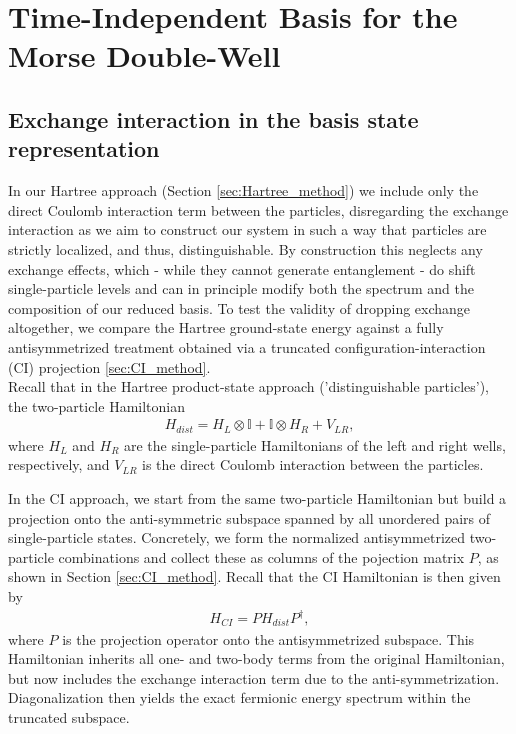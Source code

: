 \documentclass{subfiles}
\begin{document}
\section{Time-Independent Basis for the Morse Double-Well}\label{sec:time_independent_basis}


\subsection{Exchange interaction in the basis state representation}
In our Hartree approach (Section \ref{sec:Hartree_method}) we include only the direct Coulomb interaction term between the particles, disregarding the exchange interaction as we aim to construct our system in such a way that particles are strictly localized, and thus, distinguishable. By construction this neglects any exchange effects, which - while they cannot generate entanglement - do shift single-particle levels and can in principle modify both the spectrum and the composition of our reduced basis. To test the validity of dropping exchange altogether, we compare the Hartree ground-state energy against a fully antisymmetrized treatment obtained via a truncated configuration-interaction (CI) projection \ref{sec:CI_method}. \\ 

Recall that in the Hartree product-state approach ('distinguishable particles'), the two-particle Hamiltonian
\begin{align*}
    H_{dist} = H_L \otimes \mathbb{I} + \mathbb{I} \otimes H_R + V_{LR},
\end{align*}
where $H_L$ and $H_R$ are the single-particle Hamiltonians of the left and right wells, respectively, and $V_{LR}$ is the direct Coulomb interaction between the particles. 

In the CI approach, we start from the same two-particle Hamiltonian but build a projection onto the anti-symmetric subspace spanned by all unordered pairs of single-particle states. Concretely, we form the normalized antisymmetrized two-particle combinations and  collect these as columns of the pojection matrix $P$, as shown in Section \ref{sec:CI_method}. Recall that the CI Hamiltonian is then given by
\begin{align*}
    H_{CI} = P H_{dist} P^\dagger,
\end{align*}
where $P$ is the projection operator onto the antisymmetrized subspace. This Hamiltonian inherits all one- and two-body terms from the original Hamiltonian, but now includes the exchange interaction term due to the anti-symmetrization. Diagonalization then yields the exact fermionic energy spectrum within the truncated subspace.
\end{document}
